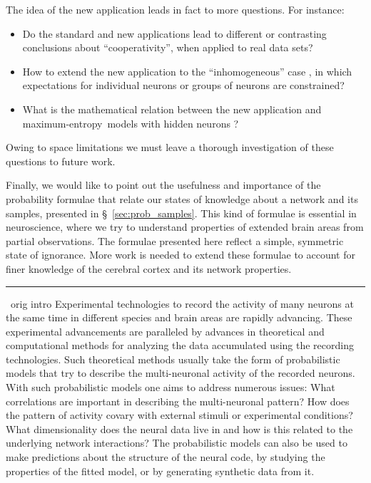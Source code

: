 \documentclass[\ifafour a4paper,12pt,\else a5paper,10pt,\fi%
onecolumn,oneside,article,%
british%
]{memoir}
\theoremstyle{remark}
\theoremstyle{innote}
\newcommand*{\citep}{\parencites}
\renewcommand*{\|}{\nonscript\,\vert\nonscript\;\mathopen{}}
\newcommand*{\sect}{\S}%
\newcommand*{\cf}{{cf.}}
\newcommand*{\puzzle}{{\fontencoding{U}\fontfamily{fontawesometwo}\selectfont\symbol{225}}}
\newcommand{\mynote}[1]{ {\color{notecolour}\puzzle\ #1}}
\newcommand*{\me}{maximum-entropy}
\begin{document}
The idea of the new application leads in fact to more questions. For
instance:
\begin{itemize}
\item Do the standard and new applications lead to different or contrasting
  conclusions about \enquote{cooperativity}, when applied to real data
  sets?
\item How to extend the new application to the \enquote{inhomogeneous} case
  \citep{schneidmanetal2006,shlensetal2006,roudietal2009b}, in which
  expectations for individual neurons or groups of neurons are constrained?
\item What is the mathematical relation between the new application and
  \me\ models with hidden neurons
  \citep{smolensky1986,kulkarnietal2007,huang2015,dunnetal2017}?
\end{itemize}
Owing to space limitations we must leave a thorough investigation of these
questions to future work.

Finally, we would like to point out the usefulness and importance of the
probability formulae that relate our states of knowledge about a network
and its samples, presented in \sect~\ref{sec:prob_samples}. This kind of
formulae is essential in neuroscience, where we try to understand
properties of extended brain areas from partial observations. The
formulae presented here reflect a simple, symmetric state of ignorance.
More work is needed \citep[\cf][]{levinaetal2017} to extend these formulae
to account for finer knowledge of the cerebral cortex and its network
properties.


\clearpage

\hrule
{}\label{orig_intro}
\mynote{orig intro}
Experimental technologies to record the activity of many neurons at the
same time in different species and brain areas are rapidly advancing. These
experimental advancements are paralleled by advances in theoretical and
computational methods for analyzing the data accumulated using the
recording technologies. Such theoretical methods usually take the form of
probabilistic models that try to describe the multi-neuronal activity of
the recorded neurons. With such probabilistic models one aims to address
numerous issues: What correlations are important in describing the
multi-neuronal pattern? How does the pattern of activity covary with
external stimuli or experimental conditions? What dimensionality does the
neural data live in and how is this related to the underlying network
interactions? The probabilistic models can also be used to make predictions
about the structure of the neural code, by studying the properties of the
fitted model, or by generating synthetic data from it.
\end{document}
